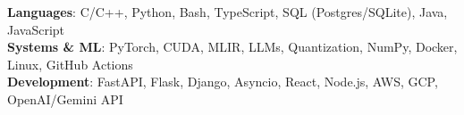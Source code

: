 \begin{itemize}[leftmargin=0.15in, label={}]
   \small{\item{
    \textbf{Languages}{: C/C++, Python, Bash, TypeScript, SQL (Postgres/SQLite), Java, JavaScript} \\
    \textbf{Systems \& ML}{: PyTorch, CUDA, MLIR, LLMs, Quantization, NumPy, Docker, Linux, GitHub Actions} \\
    \textbf{Development}{: FastAPI, Flask, Django, Asyncio, React, Node.js, AWS, GCP, OpenAI/Gemini API}
   }}
\end{itemize}
